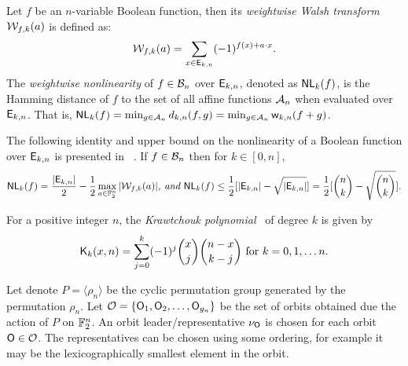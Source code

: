 \documentclass{llncs}
\begin{document}
Let $f$ be an $n$-variable Boolean function, then its {\em weightwise Walsh transform} $\mathcal{W}_{f,k}(a)$ is defined as:
\[\mathcal{W}_{f,k}(a) = \sum_{x \in \mathsf{E}_{k,n}} (-1)^{f(x)+ a \cdot x}.\]
The {\em weightwise nonlinearity} of $f \in \mathcal{B}_n$ over $\mathsf{E}_{k,n}$, denoted as $\mathsf{NL}_{k}(f)$, is the Hamming distance of $f$ to the set of all affine functions $\mathcal{A}_n$ when evaluated over $\mathsf{E}_{k,n}$. 
That is, $\mathsf{NL}_{k}(f) = \min_{g \in \mathcal{A}_n} d_{k,n}(f,g) = \min_{g \in \mathcal{A}_n} \mathsf{w}_{k,n}(f+g)$.

The following identity and upper bound on the nonlinearity of a Boolean function over $\mathsf{E}_{k,n}$ is presented in ~\cite{TOSC:CarMeaRot17}.
If $f \in \mathcal{B}_n$ then for $k \in [0,n]$, 
\[\mathsf{NL}_{k}(f) = \frac{|\mathsf{E}_{k,n}|}{2}- \frac{1}{2}\max_{a \in \mathbb{F}_2^n} |\mathcal{W}_{f,k}(a)| \textit{, and }
 \mathsf{NL}_{k}(f) \leq \frac{1}{2} [|\mathsf{E}_{k,n}| - \sqrt{|\mathsf{E}_{k,n}|}] = \frac{1}{2} [{n \choose k} - \sqrt{{n \choose k}}].\]

For a positive integer $n$, the {\em Krawtchouk polynomial}~\cite[Page $151$]{book:MacSlo78} of degree $k$ is given by 
\[\mathsf{K}_{k}(x,n)= \sum_{j=0}^{k} (-1)^j {x \choose j} {n-x \choose k-j} \text{ for } k = 0, 1, \ldots n.\]
\iffalse
Following the results in~\cite{DCC:DalMaiSar06,DAM:GinMea22}, the following relations can be derived.
\begin{theorem}[Krawtchouk Polynomials relations] \label{thm:Kraw}
For integers $n > 0$, $0 \leq k \leq n$ and fixed $a \in \F_2^n$ such that $\w(a) = \ell$, the following relations hold.
\begin{enumerate}
\item $\sum\limits_{x \in \Ekn{k}{n}} (-1)^{a.x} = \kraw{k}{\ell}{n}$.
\item If $l_{a,b}(x)= a \cdot x + b$, where $a \in \F_2^n, b \in \F_2$, be an affine Boolean function then 
\[\wkn{n}{k}(l_{a,b}) = \frac{1}{2} (|\Ekn{k}{n}| - (-1)^b \kraw{k}{\ell}{n}).\]
\end{enumerate}
\end{theorem}


A Boolean function $f$ is {\em rotation symmetric} (RotS) if and only if for any $(x_1,x_2,\ldots,x_n)\in \F_2^n$,
$f(\rho_n^k(x_1,x_2,\ldots,x_n))= f(x_1,x_2,\ldots,x_n)$ for every $1 \leq k \leq n$ where $\rho_n(x_1,x_2,\ldots,x_n) = (x_n,x_1,\ldots,x_{n-1})$ and $\rho_n^k = \rho_n \circ \rho_n^{k-1}$ for $k > 1$.
Therefore, RotS Boolean functions have the same truth value for all vectors in every orbit obtained by the action of permutation group $\langle \rho_n \rangle$ on $\F_2^n$. 
\fi
Let denote $P = \langle \rho_n \rangle$ be the cyclic permutation group generated by the permutation $\rho_n$.
Let $\mathcal{O} = \{\mathsf{O}_1, \mathsf{O}_2,\ldots, \mathsf{O}_{g_n}\}$ be the set of orbits obtained due the action of $P$ on $\F_2^n$. An orbit leader/representative $\nu_{\mathsf{O}}$ is chosen for each orbit $\mathsf{O} \in \mathcal{O}$. The representatives can be chosen using some ordering, for example it may be the lexicographically smallest element in the orbit.
\end{document}
